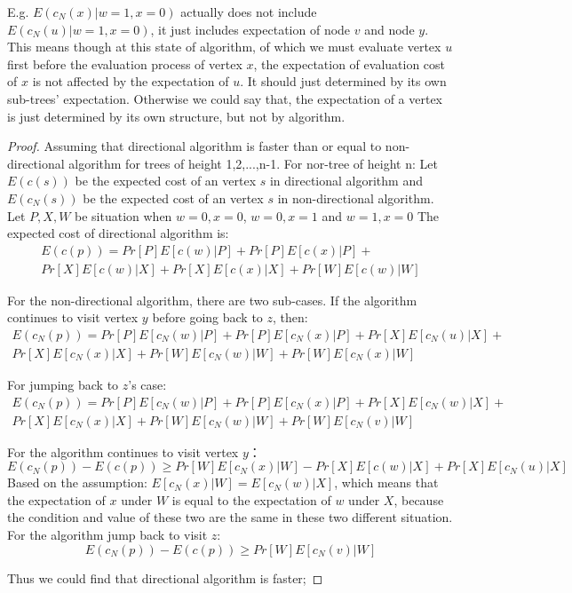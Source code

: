    E.g. $E(c_N(x)|w=1,x=0)$ actually does not include $E(c_N(u)|w=1,x=0)$, it just includes expectation of node $v$ and node $y$. This means though at this state of algorithm, of which we must evaluate vertex $u$ first before the evaluation process of vertex $x$, the expectation of evaluation cost of $x$ is not affected by the expectation of $u$. It should just determined by its own sub-trees' expectation. Otherwise we could say that, the expectation of a vertex is just determined by its own structure, but not by algorithm.
\begin{proof}       
   Assuming that directional algorithm is faster than or equal to non-directional algorithm for trees of height 1,2,...,n-1. For nor-tree of height n:
   Let $E(c(s))$ be the expected cost of an vertex $s$ in directional algorithm and $E(c_N(s))$ be the expected cost of an vertex $s$ in non-directional algorithm. Let $P,X,W$ be situation when $w=0,x=0$, $w=0,x=1$ and $w=1,x=0$
   The expected cost of directional algorithm is:
   \begin{equation}
   \begin{aligned}
   	E(c(p))=Pr[P]E[c(w)|P]+Pr[P]E[c(x)|P]+\\
   	Pr[X]E[c(w)|X]+Pr[X]E[c(x)|X]+Pr[W]E[c(w)|W]
   \end{aligned}
   \end{equation} 
   
   For the non-directional algorithm, there are two sub-cases. 
   If the algorithm continues to visit vertex $y$ before going back to $z$, then:
   \begin{equation}
   \begin{aligned}
     E(c_N(p))=Pr[P]E[c_N(w)|P]+Pr[P]E[c_N(x)|P]+Pr[X]E[c_N(u)|X]+\\
     Pr[X]E[c_N(x)|X]+Pr[W]E[c_N(w)|W]+Pr[W]E[c_N(x)|W]
   \end{aligned}
   \end{equation}
   	
   For jumping back to $z$'s case:
   \begin{equation}
   \begin{aligned}
   	E(c_N(p))=Pr[P]E[c_N(w)|P]+Pr[P]E[c_N(x)|P]+Pr[X]E[c_N(w)|X]+\\
   	Pr[X]E[c_N(x)|X]+Pr[W]E[c_N(w)|W]+Pr[W]E[c_N(v)|W]
   \end{aligned}
   \end{equation} 
   
   For the algorithm continues to visit vertex $y$：
   \begin{equation}
   	E(c_N(p))-E(c(p))\ge Pr[W]E[c_N(x)|W]-Pr[X]E[c(w)|X]+Pr[X]E[c_N(u)|X]
   \end{equation}
   Based on the assumption: $E[c_N(x)|W]=E[c_N(w)|X]$, which means that the expectation of $x$ under $W$ is equal to the expectation of $w$ under $X$, because the condition and value of these two are the same in these two different situation.
   For the algorithm jump back to visit $z$:
   \begin{equation}
   	E(c_N(p))-E(c(p))\ge Pr[W]E[c_N(v)|W]
   \end{equation}

   Thus we could find that directional algorithm is faster;
\end{proof}


